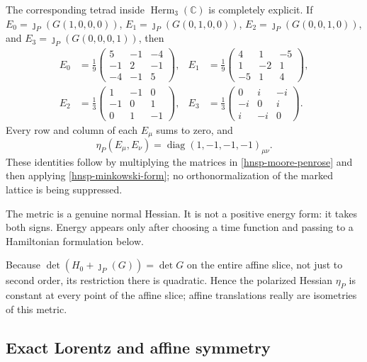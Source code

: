 The corresponding tetrad inside \(\operatorname{Herm}_3(\mathbb C)\) is
completely explicit.  If
\(E_0=\jmath_P(G(1,0,0,0))\),
\(E_1=\jmath_P(G(0,1,0,0))\),
\(E_2=\jmath_P(G(0,0,1,0))\), and
\(E_3=\jmath_P(G(0,0,0,1))\), then
\begin{align}
 E_0&=\frac19\begin{pmatrix}5&-1&-4\\-1&2&-1\\-4&-1&5\end{pmatrix},&
 E_1&=\frac19\begin{pmatrix}4&1&-5\\1&-2&1\\-5&1&4\end{pmatrix},
 \label{hnsp-explicit-tetrad-real}\\
 E_2&=\frac13\begin{pmatrix}1&-1&0\\-1&0&1\\0&1&-1\end{pmatrix},&
 E_3&=\frac13\begin{pmatrix}0&i&-i\\-i&0&i\\i&-i&0\end{pmatrix}.
 \label{hnsp-explicit-tetrad-imaginary}
\end{align}
Every row and column of each \(E_\mu\) sums to zero, and
\begin{equation}
 \eta_P(E_\mu,E_\nu)=\operatorname{diag}(1,-1,-1,-1)_{\mu\nu}.
 \label{hnsp-tetrad-metric}
\end{equation}
These identities follow by multiplying the matrices in
\eqref{hnsp-moore-penrose} and then applying
\eqref{hnsp-minkowski-form}; no orthonormalization of the marked lattice is
being suppressed.

The metric is a genuine normal Hessian.  It is not a positive energy form:
it takes both signs.  Energy appears only after choosing a time function and
passing to a Hamiltonian formulation below.

Because
\(
 \det(H_0+\jmath_P(G))=\det G
\)
on the entire affine slice, not just to second order, its restriction there is
quadratic.  Hence the polarized Hessian \(\eta_P\) is constant at every point
of the affine slice; affine translations really are isometries of this metric.

\subsection{Exact Lorentz and affine symmetry}


